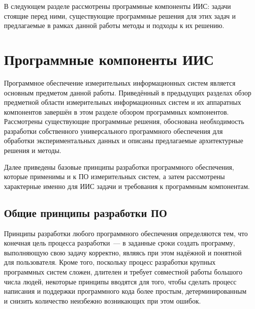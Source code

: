 \documentclass[a4paper, 14pt, titlepage]{extarticle}
\let\oldsection\section
\renewcommand{\section}{\newpage\oldsection}
\begin{document}
  В следующем разделе рассмотрены программные компоненты ИИС: задачи стоящие перед ними, существующие
  программные решения для этих задач и предлагаемые в рамках данной работы методы и подходы к их решению.

  \section{Программные компоненты ИИС}\label{sec:software}

  Программное обеспечение измерительных информационных систем является основным предметом данной
  работы. Приведённый в предыдущих разделах обзор предметной области измерительных информационных
  систем и их аппаратных компонентов завершён в этом разделе обзором программных компонентов.
  Рассмотрены существующие программные решения, обоснована необходимость разработки собственного
  универсального программного обеспечения для обработки экспериментальных данных и описаны
  предлагаемые архитектурные решения и методы.

  Далее приведены базовые принципы разработки программного обеспечения, которые применимы и к ПО
  измерительных систем, а затем рассмотрены характерные именно для ИИС задачи и требования к
  программным компонентам.


  \subsection{Общие принципы разработки ПО}\label{ssec:software-principles}


  Принципы разработки любого программного обеспечения определяются тем, что конечная цель
  процесса разработки~--- в заданные сроки создать
  программу, выполняющую свою задачу корректно, являясь при этом надёжной и понятной для
  пользователя. Кроме того, поскольку процесс разработки крупных программных систем сложен, длителен и
  требует совместной работы большого числа людей, некоторые принципы вводятся для того, чтобы
  сделать процесс написания и поддержки программного кода более простым, детерминированным и
  снизить количество неизбежно возникающих при этом ошибок.
\end{document}

